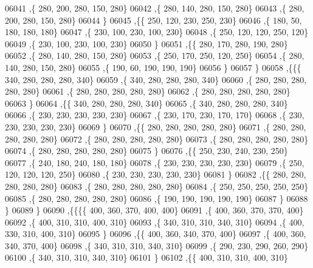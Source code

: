 \begin{DoxyCode}
06041     ,\{   280,   200,   280,   150,   280\}
06042     ,\{   280,   140,   280,   150,   280\}
06043     ,\{   280,   200,   280,   150,   280\}
06044     \}
06045    ,\{\{   250,   120,   230,   250,   230\}
06046     ,\{   180,    50,   180,   180,   180\}
06047     ,\{   230,   100,   230,   100,   230\}
06048     ,\{   250,   120,   120,   250,   120\}
06049     ,\{   230,   100,   230,   100,   230\}
06050     \}
06051    ,\{\{   280,   170,   280,   190,   280\}
06052     ,\{   280,   140,   280,   150,   280\}
06053     ,\{   250,   170,   250,   120,   250\}
06054     ,\{   280,   140,   280,   150,   280\}
06055     ,\{   190,    60,   190,   190,   190\}
06056     \}
06057    \}
06058   ,\{\{\{   340,   280,   280,   280,   340\}
06059     ,\{   340,   280,   280,   280,   340\}
06060     ,\{   280,   280,   280,   280,   280\}
06061     ,\{   280,   280,   280,   280,   280\}
06062     ,\{   280,   280,   280,   280,   280\}
06063     \}
06064    ,\{\{   340,   280,   280,   280,   340\}
06065     ,\{   340,   280,   280,   280,   340\}
06066     ,\{   230,   230,   230,   230,   230\}
06067     ,\{   230,   170,   230,   170,   170\}
06068     ,\{   230,   230,   230,   230,   230\}
06069     \}
06070    ,\{\{   280,   280,   280,   280,   280\}
06071     ,\{   280,   280,   280,   280,   280\}
06072     ,\{   280,   280,   280,   280,   280\}
06073     ,\{   280,   280,   280,   280,   280\}
06074     ,\{   280,   280,   280,   280,   280\}
06075     \}
06076    ,\{\{   250,   230,   240,   230,   250\}
06077     ,\{   240,   180,   240,   180,   180\}
06078     ,\{   230,   230,   230,   230,   230\}
06079     ,\{   250,   120,   120,   120,   250\}
06080     ,\{   230,   230,   230,   230,   230\}
06081     \}
06082    ,\{\{   280,   280,   280,   280,   280\}
06083     ,\{   280,   280,   280,   280,   280\}
06084     ,\{   250,   250,   250,   250,   250\}
06085     ,\{   280,   280,   280,   280,   280\}
06086     ,\{   190,   190,   190,   190,   190\}
06087     \}
06088    \}
06089   \}
06090  ,\{\{\{\{   400,   360,   370,   400,   400\}
06091     ,\{   400,   360,   370,   370,   400\}
06092     ,\{   400,   310,   310,   400,   310\}
06093     ,\{   340,   310,   310,   340,   310\}
06094     ,\{   400,   330,   310,   400,   310\}
06095     \}
06096    ,\{\{   400,   360,   340,   370,   400\}
06097     ,\{   400,   360,   340,   370,   400\}
06098     ,\{   340,   310,   310,   340,   310\}
06099     ,\{   290,   230,   290,   260,   290\}
06100     ,\{   340,   310,   310,   340,   310\}
06101     \}
06102    ,\{\{   400,   310,   310,   400,   310\}

\end{DoxyCode}
